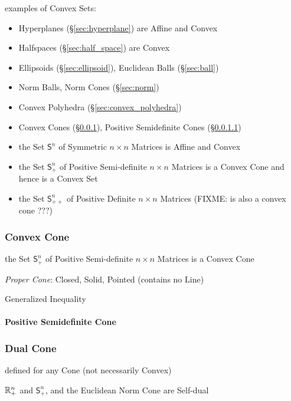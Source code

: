 examples of Convex Sets:
\begin{itemize}
  \item Hyperplanes (\S\ref{sec:hyperplane}) are Affine and Convex
  \item Halfspaces (\S\ref{sec:half_space}) are Convex
  \item Ellipsoids (\S\ref{sec:ellipsoid}), Euclidean Balls (\S\ref{sec:ball})
  \item Norm Balls, Norm Cones (\S\ref{sec:norm})
  \item Convex Polyhedra (\S\ref{sec:convex_polyhedra})
  \item Convex Cones (\S\ref{sec:convex_cone}), Positive Semidefinite Cones
    (\S\ref{sec:positive_semidefinite_cone})
  \item the Set $\mathsf{S}^n$ of Symmetric $n \times n$ Matrices is Affine and
    Convex
  \item the Set $\mathsf{S}_+^n$ of Positive Semi-definite $n \times n$
    Matrices is a Convex Cone and hence is a Convex Set
  \item the Set $\mathsf{S}_{++}^n$ of Positive Definite $n \times n$ Matrices
    (FIXME: is also a convex cone ???)
\end{itemize}



\subsubsection{Convex Cone}\label{sec:convex_cone}

the Set $\mathsf{S}_+^n$ of Positive Semi-definite $n \times n$ Matrices is a
Convex Cone

\emph{Proper Cone}: Closed, Solid, Pointed (contains no Line)

Generalized Inequality



\paragraph{Positive Semidefinite Cone}
\label{sec:positive_semidefinite_cone}\hfill



\subsubsection{Dual Cone}\label{sec:dual_cone}

defined for any Cone (not necessarily Convex)

$\mathbb{R}_+^n$ and $\mathsf{S}_+^n$, and the Euclidean Norm Cone are Self-dual

